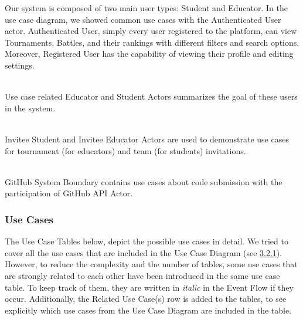 Our system is composed of two main user types: Student and Educator. In the use case diagram, we showed common use cases with the Authenticated User actor. Authenticated User, simply every user registered to the platform, can view Tournaments, Battles, and their rankings with different filters and search options. Moreover, Registered User has the capability of viewing their profile and editing settings.

\\

Use case related Educator and Student Actors summarizes the goal of these users in the system.

\\

Invitee Student and Invitee Educator Actors are used to demonstrate use cases for tournament (for educators) and team (for students) invitations.

\\

GitHub System Boundary contains use cases about code submission with the participation of GitHub API Actor.

\subsubsection{Use Cases}

The Use Case Tables below, depict the possible use cases in detail. We tried to cover all the use cases that are included in the Use Case Diagram (see \hyperref[sec:Use Case Diagram]{3.2.1}). However, to reduce the complexity and the number of tables, some use cases that are strongly related to each other have been introduced in the same use case table. To keep track of them, they are written in \textit{italic} in the Event Flow if they occur. Additionally, the Related Use Case(s) row is added to the tables, to see explicitly which use cases from the Use Case Diagram are included in the table. 

